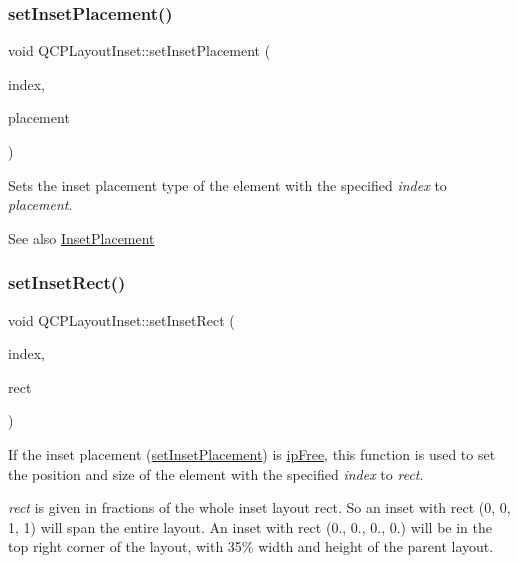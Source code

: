 \subsubsection{\texorpdfstring{set\+Inset\+Placement()}{setInsetPlacement()}}
{\footnotesize\ttfamily void Q\+C\+P\+Layout\+Inset\+::set\+Inset\+Placement (\begin{DoxyParamCaption}\item[{int}]{index,  }\item[{\hyperlink{class_q_c_p_layout_inset_a8b9e17d9a2768293d2a7d72f5e298192}{Q\+C\+P\+Layout\+Inset\+::\+Inset\+Placement}}]{placement }\end{DoxyParamCaption})}

Sets the inset placement type of the element with the specified {\itshape index} to {\itshape placement}.

\begin{DoxySeeAlso}{See also}
\hyperlink{class_q_c_p_layout_inset_a8b9e17d9a2768293d2a7d72f5e298192}{Inset\+Placement} 
\end{DoxySeeAlso}
\mbox{\label{class_q_c_p_layout_inset_aa487c8378a6f9533567a2e6430099dc3}} 
\subsubsection{\texorpdfstring{set\+Inset\+Rect()}{setInsetRect()}}
{\footnotesize\ttfamily void Q\+C\+P\+Layout\+Inset\+::set\+Inset\+Rect (\begin{DoxyParamCaption}\item[{int}]{index,  }\item[{const Q\+RectF \&}]{rect }\end{DoxyParamCaption})}

If the inset placement (\hyperlink{class_q_c_p_layout_inset_a63298830744d5d8c5345511c00fd2144}{set\+Inset\+Placement}) is \hyperlink{class_q_c_p_layout_inset_a8b9e17d9a2768293d2a7d72f5e298192a06556307ae5b8255297984219da4e8f4}{ip\+Free}, this function is used to set the position and size of the element with the specified {\itshape index} to {\itshape rect}.

{\itshape rect} is given in fractions of the whole inset layout rect. So an inset with rect (0, 0, 1, 1) will span the entire layout. An inset with rect (0., 0., 0., 0.) will be in the top right corner of the layout, with 35\% width and height of the parent layout.

